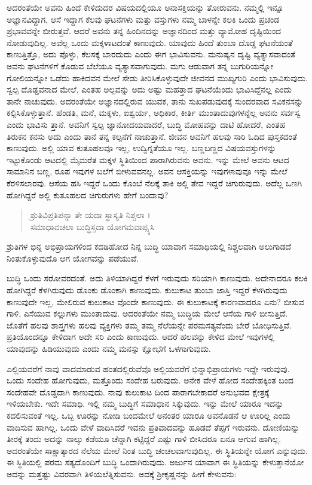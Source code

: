 ಅದರಂತೆಯೇ ಅವನು ಹಿಂದೆ ಕೇಳಿದುದರ ವಿಷಯದಲ್ಲಿಯೂ ಅನಾಸಕ್ತಿಯನ್ನು ತೋರುವನು. ನಮ್ಮಲ್ಲಿ ಇನ್ನೂ ಅಜ್ಞಾನವಿದ್ದಾಗ, ಆಸೆ ಇದ್ದಾಗ ಕೆಲವು ಘಟನೆಗಳು ಮತ್ತು ವಸ್ತುಗಳು ನಮ್ಮ ಬಾಳನ್ನೇ ಕಲಕಿ ಒಂದು ಪ್ರಚಂಡ ಪ್ರಭಾವವನ್ನೇ ಬೀರುತ್ತವೆ. ಆದರೆ ಅವನು ತನ್ನ ಹಿಂದಿನದನ್ನು ಅಜ್ಞಾನದಿಂದ ಮತ್ತು ವ್ಯಾಮೋಹ ದೃಷ್ಟಿಯಿಂದ ನೋಡುವುದಿಲ್ಲ. ಅವೆಲ್ಲ ಒಂದು ಮಕ್ಕಳಾಟದಂತೆ ಕಾಣುವುದು. ಯಾವುದು ಹಿಂದೆ ತುಂಬಾ ದೊಡ್ಡ ಘಟನೆಯಂತೆ ಕಾಣುತ್ತಿತ್ತೊ, ಅದು ಪೊಳ್ಳು, ಕೆಲಸಕ್ಕೆ ಬಾರದುದು ಎಂದು ಈಗ ಭಾವಿಸುವನು. ಮನುಷ್ಯನ ದೃಷ್ಟಿ ವ್ಯತ್ಯಾಸವಾದಂತೆ ಅವನು ಘಟನೆಗಳಿಗೆ ಕೊಡುವ ಬೆಲೆಯೂ ವ್ಯತ್ಯಾಸವಾಗುವುದು. ಮಗು ಆಡುವಾಗ ತನ್ನ ಬುಗುರಿಯನ್ನೋ ಗೋಲಿಯನ್ನೋ ಒಡೆದು ಹಾಕಿದವನ ಮೇಲೆ ಸೇಡು ತೀರಿಸಿಕೊಳ್ಳುವುದೇ ಜೀವನದ ಮುಖ್ಯಗುರಿ ಎಂದು ಭಾವಿಸುವುದು. ಸ್ವಲ್ಪ ದೊಡ್ಡವನಾದ ಮೇಲೆ, ಎಂತಹ ಅಲ್ಪವನ್ನು ಅದು ಅಷ್ಟು ಮಹತ್ತಾದ ಘಟನೆಯೆಂದು ಭಾವಿಸಿದ್ದೆನಲ್ಲ ಎಂದು ತಾನೇ ನಾಚುವುದು. ಅದರಂತೆಯೇ ಅಜ್ಞಾನದಲ್ಲಿರುವ ಯುವಕ, ತಾನು ಸುಖಪಡುವುದಕ್ಕೆ ಸುಂದರವಾದ ಸವಿಕನಸನ್ನು ಕಲ್ಪಿಸಿಕೊಳ್ಳುತ್ತಾನೆ. ಹೆಂಡತಿ, ಮನೆ, ಮಕ್ಕಳು, ಐಶ್ವರ್ಯ, ಅಧಿಕಾರ, ಕೀರ್ತಿ ಮುಂತಾದುವುಗಳನ್ನೆಲ್ಲ ಅವನು ಸರ್ವಸ್ವ ಎಂದು ಭಾವಿಸು ತ್ತಾನೆ. ಅವನಿಗೆ ಸ್ವಲ್ಪ ಜ್ಞಾನೋದಯವಾದರೆ, ಬುದ್ಧಿ ಮೋಹವನ್ನು ದಾಟಿ ಹೋದರೆ, ಎಂತಹ ತಿರುಕನ ಕನಸು ಅದು ಎಂದು ತಾನೆ ತನ್ನ ಕಲ್ಪನೆಗೆ ನಾಚುತ್ತಾನೆ. ಜೀವನ ಅವನಿಗೆ ಹಲವು ಸಾರಿ ಓದಿದ ಪುಸ್ತಕದಂತೆ ಕಾಣುವುದು. ಅಲ್ಲಿ ಯಾವ ಕುತೂಹಲವೂ ಇಲ್ಲ, ಉದ್ವಿಗ್ನತೆಯೂ ಇಲ್ಲ. ಬಣ್ಣಬಣ್ಣದ ವಿಷಯವಸ್ತುಗಳನ್ನು ಇಟ್ಟುಕೊಂಡು ಆಟದಲ್ಲಿ ಮೈಮರೆತ ಮಕ್ಕಳ ಸ್ಥಿತಿಯಿಂದ ಪಾರಾಗಿರುವನು ಅವನು. ಇನ್ನು ಮೇಲೆ ಅವನು ಆಟದ ಸಾಮಾನಿನ ಬಣ್ಣ, ರೂಪ ಇವುಗಳ ಬಲೆಗೆ ಬೀಳುವವನಲ್ಲ. ಅವನ ಆಸಕ್ತಿಯನ್ನು ಇವುಗಳಾವುವೂ ಇನ್ನು ಮೇಲೆ ಕೆರಳಿಸಲಾರವು. ಆಸೆಯ ಹಸಿ ಇದ್ದರೆ ಒಂದು ಕೊಂಬೆ ನೆಲಕ್ಕೆ ತಾಕಿ ಅಲ್ಲಿ ತೇವ ಇದ್ದರೆ ಚಿಗುರುವುದು. ಅದೆಲ್ಲ ಒಣಗಿ ಹೋಗಿದ್ದರೆ ಅಲ್ಲಿ ಕುತೂಹಲದ ಚಿಗುರುಗಳು ಹೇಗೆ ಬಂದಾವು?

\begin{verse}
ಶ್ರುತಿವಿಪ್ರತಿಪನ್ನಾ ತೇ ಯದಾ ಸ್ಥಾಸ್ಯತಿ ನಿಶ್ಚಲಾ ।\\ಸಮಾಧಾವಚಲಾ ಬುದ್ಧಿಸ್ತದಾ ಯೋಗಮವಾಪ್ಸ್ಯಸಿ 
\end{verse}

{\small ಶ್ರುತಿಗಳ ಭಿನ್ನ ಅಭಿಪ್ರಾಯಗಳಿಂದ ಕದಡಿಹೋದ ನಿನ್ನ ಬುದ್ಧಿ ಯಾವಾಗ ಸಮಾಧಿಯಲ್ಲಿ ನಿಶ್ಚಲವಾಗಿ ಅಲುಗಾಡದೆ ನಿಂತುಕೊಳ್ಳುವುದೊ ಆಗ ಯೋಗವನ್ನು ಪಡೆಯುವೆ.}

ಬುದ್ಧಿ ಒಂದು ಸರೋವರದಂತೆ. ಅದು ತಿಳಿಯಾಗಿದ್ದರೆ ಕೆಳಗೆ ಇರುವುದು ಸರಿಯಾಗಿ ಕಾಣುವುದು. ಅದೇನಾದರೂ ಕಲಕಿ ಹೋಗಿದ್ದರೆ ಕೆಳಗಿರುವುದು ಡೊಂಕು ಡೊಂಕಾಗಿ ಕಾಣುವುದು. ಕುಲುಕಾಟ ತುಂಬಾ ಜಾಸ್ತಿ ಇದ್ದರೆ ಕೆಳಗಿರುವುದು ಕಾಣುವುದೇ ಇಲ್ಲ, ಮೇಲಿರುವ ಕುಲುಕಾಟ ವೊಂದೇ ಕಾಣುವುದು. ಈ ಕುಲುಕಾಟಕ್ಕೆ ಕಾರಣವಾದರೂ ಏನು? ಬೀಸುವ ಗಾಳಿ, ಎಸೆಯುವ ಕಲ್ಲುಗಳು ಮುಂತಾದುವು. ಅದರಂತೆಯೇ ನಮ್ಮ ಬುದ್ಧಿಯ ಮೇಲೆ ಆಸೆಯ ಗಾಳಿ ಬೀಸುತ್ತಿದೆ. ಜೊತೆಗೆ ಹಲವು ಶಾಸ್ತ್ರಗಳು ಹಲವು ವ್ಯಕ್ತಿಗಳು ತಮ್ಮ ತಮ್ಮ ನೆಲೆಯನ್ನೇ ಪರಮಸತ್ಯವೆಂದು ಬೇರೆ ಬೋಧಿಸುತ್ತಿವೆ. ಪ್ರತಿಯೊಂದನ್ನೂ ಕೇಳಿದಾಗ ಅದೇ ಸರಿ ಎಂದು ಕಾಣುವುದು. ಆದರೆ ಹಲವನ್ನು ಕೇಳಿದ ಮೇಲೆ ಇವುಗಳಲ್ಲಿ ಯಾವುದನ್ನು ಹಿಡಿಯುವುದು ಎಂದು ನಮ್ಮ ಮನಸ್ಸು ಕ್ಷೋಭೆಗೆ ಒಳಗಾಗುವುದು.

ಎಲ್ಲಿಯವರೆಗೆ ನಾವು ವಾದಮಾಡುವ ಹಂತದಲ್ಲಿರುವೆವೊ ಅಲ್ಲಿಯವರೆಗೆ ಭಿನ್ನಾಭಿಪ್ರಾಯಗಳು ಇದ್ದೇ ಇರುವುವು. ಒಂದು ಸಂದೇಹ ಹೋಗುವುದು, ಮತ್ತೊಂದು ಸಂದೇಹ ಬರುವುದು. ಅನೇಕ ವೇಳೆ ಹೋದ ಸಂದೇಹಕ್ಕಿಂತ ಬಂದ ಸಂದೇಹವೇ ದೊಡ್ಡದಾಗಿ ಕಾಣುವುದು. ನಾವು ಕುಲುಕಾಟ ದಿಂದ ಪಾರಾಗಬೇಕಾದರೆ ಅನುಭವದ ಕ್ಷೇತ್ರಕ್ಕೆ ಇಳಿಯಬೇಕು. ಇದೇ ಸಮಾಧಿ. ಇಲ್ಲಿ ನಮ್ಮ ಬುದ್ಧಿಗೆ ಸಮಾಧಾನ ಸಿಕ್ಕುವುದು. ಇನ್ನು ಮೇಲೆ ಯಾರೂ ಇದನ್ನು ಕದಲಿಸುವಂತೆ ಇಲ್ಲ. ಒಬ್ಬ ಊರನ್ನು ನೋಡಿ ಬಂದಮೇಲೆ ಅನಂತರ ಯಾರೂ ಅವನೊಡನೆ ಆ ಊರಿಲ್ಲ ಎಂದು ವಾದಿಸುವ ಹಾಗಿಲ್ಲ. ಒಂದು ವೇಳೆ ವಾದಿಸಿದರೆ ಇವನು ಪ್ರತಿವಾದವನ್ನು ಹೂಡದೆ ತೆಪ್ಪಗೆ ಇರುವನು. ದೋಣಿಯನ್ನು ತೀರಕ್ಕೆ ತಂದು ಅದನ್ನು ನಾಲ್ಕು ಕಡೆಯೂ ಚೆನ್ನಾಗಿ ಕಟ್ಟಿದ್ದರೆ ಎಷ್ಟು ಗಾಳಿ ಬೀಸಿದರೂ ಏನೂ ಆಗುವ ಹಾಗಿಲ್ಲ. ಅದರಂತೆಯೇ ಸಾಕ್ಷಾತ್ಕಾರದ ನೆಲೆಯ ಮೇಲೆ ನಿಂತ ಬುದ್ಧಿ ಚಂಚಲವಾಗುವುದಿಲ್ಲ. ಈ ಸ್ಥಿತಿಯನ್ನೇ ಯೋಗ ಎನ್ನುವುದು. ಈ ಸ್ಥಿತಿಯಲ್ಲಿ ಪರಮ ಸತ್ಯದೊಂದಿಗೆ ಬುದ್ಧಿ ಒಂದಾಗಿರುವುದು. ಅರ್ಜುನ ಯಾವಾಗ ಈ ಸ್ಥಿತಿಯನ್ನು ಕೇಳುತ್ತಾನೆಯೋ ಅದನ್ನು ಮತ್ತಷ್ಟು ವಿವರವಾಗಿ ತಿಳಿಯಲೆತ್ನಿಸುವನು. ಅದಕ್ಕೆ ಶ್ರೀಕೃಷ್ಣನನ್ನು ಹೀಗೆ ಕೇಳುವನು:

